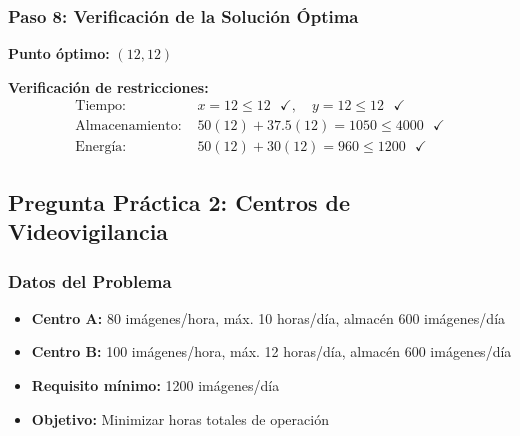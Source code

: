 \documentclass[12pt]{article}
\begin{document}
	\subsubsection*{Paso 8: Verificación de la Solución Óptima}
	\textbf{Punto óptimo:} $(12, 12)$
	
	\textbf{Verificación de restricciones:}
	\begin{align}
		\text{Tiempo: } &x = 12 \leq 12 \text{ } \checkmark, \quad y = 12 \leq 12 \text{ } \checkmark\\
		\text{Almacenamiento: } &50(12) + 37.5(12) = 1050 \leq 4000 \text{ } \checkmark\\
		\text{Energía: } &50(12) + 30(12) = 960 \leq 1200 \text{ } \checkmark
	\end{align}
	
	\begin{center}
	\end{center}
	
	\newpage
	
	\subsection*{Pregunta Práctica 2: Centros de Videovigilancia}
	
	\subsubsection*{Datos del Problema}
	\begin{itemize}
		\item \textbf{Centro A:} 80 imágenes/hora, máx. 10 horas/día, almacén 600 imágenes/día
		\item \textbf{Centro B:} 100 imágenes/hora, máx. 12 horas/día, almacén 600 imágenes/día
		\item \textbf{Requisito mínimo:} 1200 imágenes/día
		\item \textbf{Objetivo:} Minimizar horas totales de operación
	\end{itemize}
	
\end{document}
